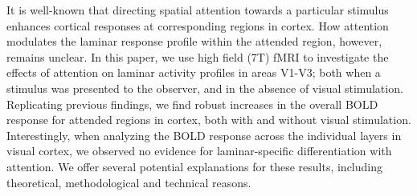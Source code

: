 It is well-known that directing spatial attention towards a particular stimulus enhances cortical responses at corresponding regions in cortex. How attention modulates the laminar response profile within the attended region, however, remains unclear. In this paper, we use high field (7T) fMRI to investigate the effects of attention on laminar activity profiles in areas V1-V3; both when a stimulus was presented to the observer, and in the absence of visual stimulation. Replicating previous findings, we find robust increases in the overall BOLD response for attended regions in cortex, both with and without visual stimulation. Interestingly, when analyzing the BOLD response across the individual layers in visual cortex, we observed no evidence for laminar-specific differentiation with attention. We offer several potential explanations for these results, including theoretical, methodological and technical reasons.